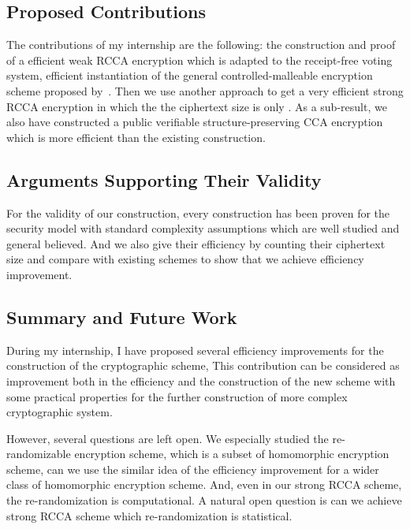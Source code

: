 \subsection*{Proposed Contributions}
The contributions of my internship are the following: 
the construction and proof of a efficient weak RCCA encryption which is adapted to the receipt-free voting system,
efficient instantiation of the general controlled-malleable encryption scheme proposed by~\cite{DBLP:conf/eurocrypt/ChaseKLM12}.
Then we use another approach to get a very efficient strong RCCA encryption in which the the ciphertext size is only .
As a sub-result, we also have constructed a public verifiable structure-preserving CCA encryption which is more efficient than the existing construction.

\subsection*{Arguments Supporting Their Validity}
For the validity of our construction,
every construction has been proven for the security model with standard complexity assumptions which are well studied and general believed.
And we also give their efficiency by counting their ciphertext size and compare with existing schemes to show that we achieve efficiency improvement.

\subsection*{Summary and Future Work}
During my internship, I have proposed several efficiency improvements for the construction of the cryptographic scheme,
This contribution can be considered as improvement both in the efficiency and the construction of the new scheme with some practical properties for the further construction of more complex cryptographic system.

However, several questions are left open. 
We especially studied the re-randomizable encryption scheme, which is a subset of homomorphic encryption scheme,
can we use the similar idea of the efficiency improvement for a wider class of homomorphic encryption scheme.
And, even in our strong RCCA scheme, the re-randomization is computational.
A natural open question is can we achieve strong RCCA scheme which re-randomization is statistical.

